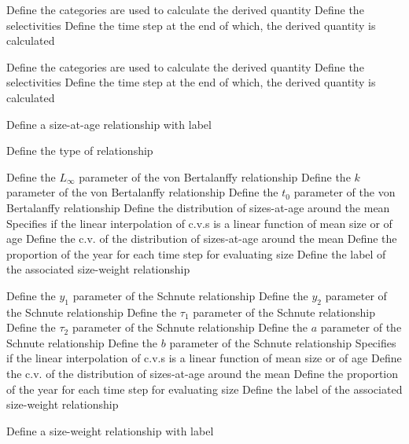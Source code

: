  {Define the categories are used to calculate the derived quantity}
 {Define the selectivities}
 {Define the time step at the end of which, the derived quantity is calculated}
\par\textbf{}\par
{} {Define the categories are used to calculate the derived quantity}
 {Define the selectivities}
 {Define the time step at the end of which, the derived quantity is calculated}
\par {} {Define a size-at-age relationship with label}\par
{} {Define the type of relationship}
\par\textbf{}\par
{} {Define the $L_\infty$ parameter of the von Bertalanffy relationship}
 {Define the $k$ parameter of the von Bertalanffy relationship}
 {Define the $t_0$ parameter of the von Bertalanffy relationship}
 {Define the distribution of sizes-at-age around the mean}
 {Specifies if the linear interpolation of c.v.s is a linear function of mean size or of age}
 {Define the c.v. of the distribution of sizes-at-age around the mean}
 {Define the proportion of the year for each time step for evaluating size}
 {Define the label of the associated size-weight relationship}
\par\textbf{}\par
{} {Define the $y_1$ parameter of the Schnute relationship}
 {Define the $y_2$ parameter of the Schnute relationship}
 {Define the $\tau_1$ parameter of the Schnute relationship}
 {Define the $\tau_2$ parameter of the Schnute relationship}
 {Define the $a$ parameter of the Schnute relationship}
 {Define the $b$ parameter of the Schnute relationship}
 {Specifies if the linear interpolation of c.v.s is a linear function of mean size or of age}
 {Define the c.v. of the distribution of sizes-at-age around the mean}
 {Define the proportion of the year for each time step for evaluating size}
 {Define the label of the associated size-weight relationship}
\par {} {Define a size-weight relationship with label}\par
